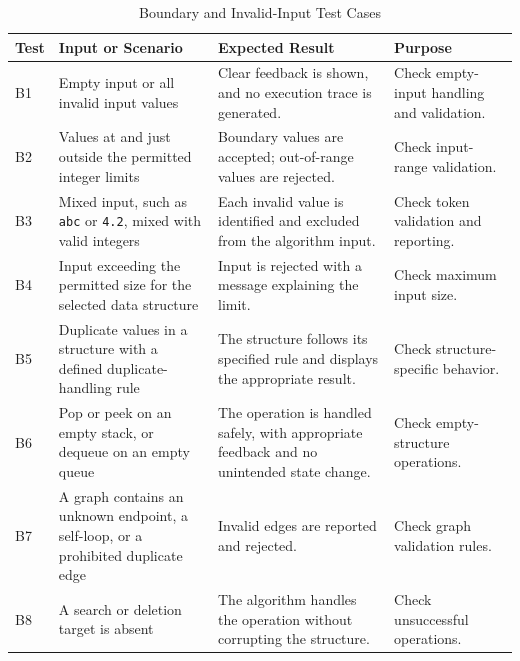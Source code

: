 \documentclass[11pt,a4paper]{article}
\renewcommand{\arraystretch}{1.06}
\begin{document}
\begin{table}[htbp]
\centering
\small
\renewcommand{\arraystretch}{1.3}
\setlength{\tabcolsep}{5pt}

\begin{tabularx}{\textwidth}{
    @{}
    >{\raggedright\arraybackslash}p{0.7cm}
    >{\raggedright\arraybackslash}X
    >{\raggedright\arraybackslash}X
    >{\raggedright\arraybackslash}X
    @{}
}
\toprule
\textbf{Test} &
\textbf{Input or Scenario} &
\textbf{Expected Result} &
\textbf{Purpose} \\
\midrule

B1 &
Empty input or all invalid input values&
Clear feedback is shown, and no execution trace is generated. &
Check empty-input handling and validation. \\
\midrule

B2 &
Values at and just outside the permitted integer limits &
Boundary values are accepted; out-of-range values are rejected. &
Check input-range validation. \\
\midrule

B3 &
Mixed input, such as \texttt{abc} or \texttt{4.2}, mixed with valid integers &
Each invalid value is identified and excluded from the algorithm input. &
Check token validation and reporting. \\
\midrule

B4 &
Input exceeding the permitted size for the selected data structure &
Input is rejected with a message explaining the limit. &
Check maximum input size. \\
\midrule

B5 &
Duplicate values in a structure with a defined duplicate-handling rule &
The structure follows its specified rule and displays the appropriate result. &
Check structure-specific behavior. \\
\midrule

B6 &
Pop or peek on an empty stack, or dequeue on an empty queue &
The operation is handled safely, with appropriate feedback and no unintended state change. &
Check empty-structure operations. \\
\midrule

B7 &
A graph contains an unknown endpoint, a self-loop, or a prohibited duplicate edge &
Invalid edges are reported and rejected. &
Check graph validation rules. \\
\midrule

B8 &
A search or deletion target is absent &
The algorithm handles the operation without corrupting the structure. &
Check unsuccessful operations. \\

\bottomrule
\end{tabularx}

\caption{Boundary and Invalid-Input Test Cases}
\label{tab:boundary-tests}
\end{table}
\end{document}
